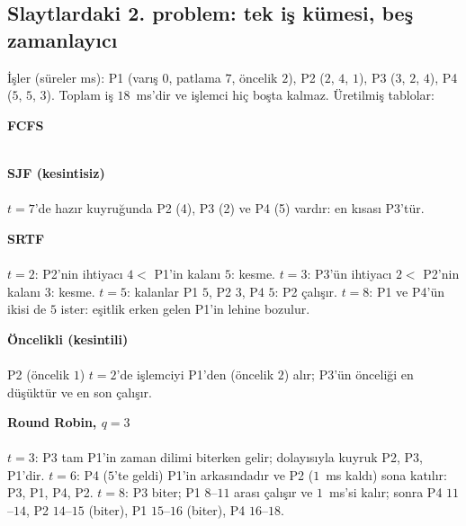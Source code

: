 \subsection{Slaytlardaki 2. problem: tek iş kümesi, beş zamanlayıcı}
İşler (süreler ms): P1 (varış $0$, patlama $7$, öncelik $2$), P2 ($2$, $4$, $1$), P3 ($3$, $2$, $4$), P4 ($5$, $5$, $3$). Toplam iş $18$~ms'dir ve işlemci hiç boşta kalmaz. Üretilmiş tablolar:

\textbf{FCFS}\\[0.2em]
\\[0.3em]
{\small{}}

\textbf{SJF (kesintisiz)}\\[0.2em]
\\[0.3em]
$t=7$'de hazır kuyruğunda P2 (4), P3 (2) ve P4 (5) vardır: en kısası P3'tür.\\
{\small{}}

\textbf{SRTF}\\[0.2em]
\\[0.3em]
$t=2$: P2'nin ihtiyacı $4 <$ P1'in kalanı $5$: kesme. $t=3$: P3'ün ihtiyacı $2 <$ P2'nin kalanı $3$: kesme. $t=5$: kalanlar P1 $5$, P2 $3$, P4 $5$: P2 çalışır. $t=8$: P1 ve P4'ün ikisi de $5$ ister: eşitlik erken gelen P1'in lehine bozulur.\\
{\small{}}

\textbf{Öncelikli (kesintili)}\\[0.2em]
\\[0.3em]
P2 (öncelik $1$) $t=2$'de işlemciyi P1'den (öncelik $2$) alır; P3'ün önceliği en düşüktür ve en son çalışır.\\
{\small{}}

\textbf{Round Robin, $q = 3$}\\[0.2em]
\\[0.3em]
$t=3$: P3 tam P1'in zaman dilimi biterken gelir; dolayısıyla kuyruk P2, P3, P1'dir. $t=6$: P4 ($5$'te geldi) P1'in arkasındadır ve P2 ($1$~ms kaldı) sona katılır: P3, P1, P4, P2. $t=8$: P3 biter; P1 $8$--$11$ arası çalışır ve $1$~ms'si kalır; sonra P4 $11$--$14$, P2 $14$--$15$ (biter), P1 $15$--$16$ (biter), P4 $16$--$18$.\\
{\small{}}

